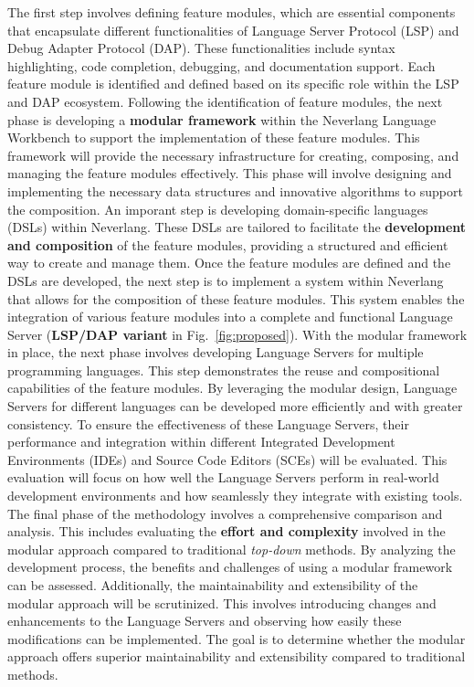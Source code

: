 The first step involves defining feature modules, which are essential components that encapsulate different functionalities of Language Server Protocol (LSP) and Debug Adapter Protocol (DAP). These functionalities include syntax highlighting, code completion, debugging, and documentation support. Each feature module is identified and defined based on its specific role within the LSP and DAP ecosystem. Following the identification of feature modules, the next phase is developing a \textbf{modular framework} within the Neverlang Language Workbench to support the implementation of these feature modules. This framework will provide the necessary infrastructure for creating, composing, and managing the feature modules effectively. This phase will involve designing and implementing the necessary data structures and innovative algorithms to support the composition.
An imporant step is developing domain-specific languages (DSLs) within Neverlang. These DSLs are tailored to facilitate the \textbf{development and composition} of the feature modules, providing a structured and efficient way to create and manage them. Once the feature modules are defined and the DSLs are developed, the next step is to implement a system within Neverlang that allows for the composition of these feature modules. This system enables the integration of various feature modules into a complete and functional Language Server (\textbf{LSP/DAP variant} in Fig.~\ref{fig:proposed}). With the modular framework in place, the next phase involves developing Language Servers for multiple programming languages. This step demonstrates the reuse and compositional capabilities of the feature modules. By leveraging the modular design, Language Servers for different languages can be developed more efficiently and with greater consistency. To ensure the effectiveness of these Language Servers, their performance and integration within different Integrated Development Environments (IDEs) and Source Code Editors (SCEs) will be evaluated. This evaluation will focus on how well the Language Servers perform in real-world development environments and how seamlessly they integrate with existing tools. The final phase of the methodology involves a comprehensive comparison and analysis. This includes evaluating the \textbf{effort and complexity} involved in the modular approach compared to traditional \textit{top-down} methods. By analyzing the development process, the benefits and challenges of using a modular framework can be assessed. Additionally, the maintainability and extensibility of the modular approach will be scrutinized. This involves introducing changes and enhancements to the Language Servers and observing how easily these modifications can be implemented. The goal is to determine whether the modular approach offers superior maintainability and extensibility compared to traditional methods.

